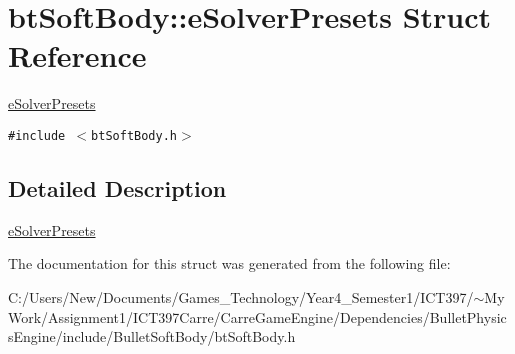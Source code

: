 \hypertarget{structbt_soft_body_1_1e_solver_presets}{
\section{btSoftBody::eSolverPresets Struct Reference}
\label{structbt_soft_body_1_1e_solver_presets}
}
\hyperlink{structbt_soft_body_1_1e_solver_presets}{eSolverPresets}  


{\tt \#include $<$btSoftBody.h$>$}



\subsection{Detailed Description}
\hyperlink{structbt_soft_body_1_1e_solver_presets}{eSolverPresets} 

The documentation for this struct was generated from the following file:\begin{CompactItemize}
\item 
C:/Users/New/Documents/Games\_\-Technology/Year4\_\-Semester1/ICT397/$\sim$My Work/Assignment1/ICT397Carre/CarreGameEngine/Dependencies/BulletPhysicsEngine/include/BulletSoftBody/btSoftBody.h\end{CompactItemize}
